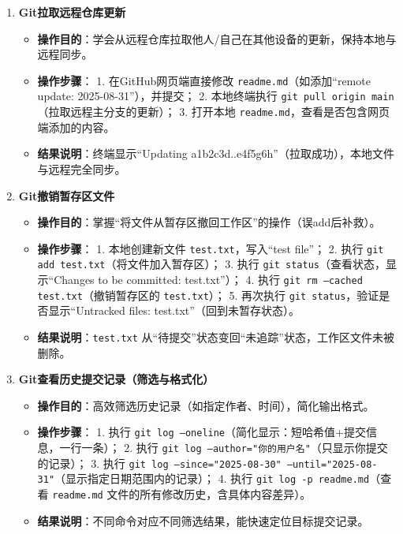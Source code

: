 \documentclass[a4paper]{article}
\begin{document}
\begin{enumerate}[itemsep=2\parskip, label=实例1.\arabic*]
\item \textbf{Git拉取远程仓库更新}
  \begin{itemize}[leftmargin=2em, itemsep=0.5\parskip]
    \item \textbf{操作目的}：学会从远程仓库拉取他人/自己在其他设备的更新，保持本地与远程同步。
    \item \textbf{操作步骤}：
      1. 在GitHub网页端直接修改 \texttt{readme.md}（如添加“remote update: 2025-08-31”），并提交；
      2. 本地终端执行 \texttt{git pull origin main}（拉取远程主分支的更新）；
      3. 打开本地 \texttt{readme.md}，查看是否包含网页端添加的内容。
    \item \textbf{结果说明}：终端显示“Updating a1b2c3d..e4f5g6h”（拉取成功），本地文件与远程完全同步。
  \end{itemize}

\item \textbf{Git撤销暂存区文件}
  \begin{itemize}[leftmargin=2em, itemsep=0.5\parskip]
    \item \textbf{操作目的}：掌握“将文件从暂存区撤回工作区”的操作（误add后补救）。
    \item \textbf{操作步骤}：
      1. 本地创建新文件 \texttt{test.txt}，写入“test file”；
      2. 执行 \texttt{git add test.txt}（将文件加入暂存区）；
      3. 执行 \texttt{git status}（查看状态，显示“Changes to be committed: test.txt”）；
      4. 执行 \texttt{git rm --cached test.txt}（撤销暂存区的 \texttt{test.txt}）；
      5. 再次执行 \texttt{git status}，验证是否显示“Untracked files: test.txt”（回到未暂存状态）。
    \item \textbf{结果说明}：\texttt{test.txt} 从“待提交”状态变回“未追踪”状态，工作区文件未被删除。
  \end{itemize}

\item \textbf{Git查看历史提交记录（筛选与格式化）}
  \begin{itemize}[leftmargin=2em, itemsep=0.5\parskip]
    \item \textbf{操作目的}：高效筛选历史记录（如指定作者、时间），简化输出格式。
    \item \textbf{操作步骤}：
      1. 执行 \texttt{git log --oneline}（简化显示：短哈希值+提交信息，一行一条）；
      2. 执行 \texttt{git log --author="你的用户名"}（只显示你提交的记录）；
      3. 执行 \texttt{git log --since="2025-08-30" --until="2025-08-31"}（显示指定日期范围内的记录）；
      4. 执行 \texttt{git log -p readme.md}（查看 \texttt{readme.md} 文件的所有修改历史，含具体内容差异）。
    \item \textbf{结果说明}：不同命令对应不同筛选结果，能快速定位目标提交记录。
  \end{itemize}


\end{enumerate}
\end{document}
